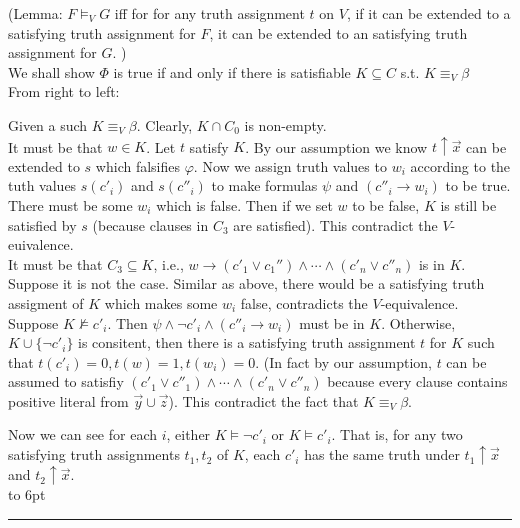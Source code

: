 \documentclass[12pt]{article}
\newenvironment{proof}{\parindent=0pt{\bf Proof: }}{
   \hspace*{\fill}\hbox to 6pt{\leaders\hrule width 6pt height 6pt\hfill}\par}
\begin{document}
\begin{proof}
(Lemma: $F\models_V G$ iff for for any truth assignment $t$ on $V$, if it can be extended to a satisfying truth assignment for $F$, it can be extended to an satisfying truth assignment for $G$.
) \\

We shall show $\Phi$ is true if and only if there is satisfiable $K\subseteq C$ s.t. $K\equiv_V \beta$\\



\color{red} From right to left:\color{black}

Given a such $K\equiv_V \beta$.
Clearly, $K\cap C_0$ is non-empty.\\



It must be that $w\in K$.
Let $t$ satisfy $K$.
By our assumption we know $t\uparrow\vec{x}$ can be extended to $s$ which falsifies $\varphi$. Now we assign truth values to $w_i$ according to the tuth values $s(c'_i)$ and $s(c''_i)$ to make formulas $\psi$ and  $(c''_i\rightarrow w_i)$ to be true. There  must be some $w_i$ which is false. Then if we set $w$ to be false, $K$ is still be satisfied by $s$ (because clauses in $C_3$ are satisfied). This contradict the $V$-euivalence.\\

It must be that $C_3\subseteq K$, i.e., $w\rightarrow (c'_1\vee c_1'')\wedge\cdots\wedge (c'_n\vee c''_n)$ is in $K$. Suppose it is not the case. Similar as above, there would be a satisfying truth assigment of $K$ which makes some $w_i$ false, contradicts the $V$-equivalence. \\


Suppose $K\not\models c'_i$. Then $\psi\wedge\neg c'_i \wedge (c''_i\rightarrow w_i)$ must be in $K$.
Otherwise, $K\cup\{\neg c'_i\}$ is consitent,  then there is a satisfying truth assignment $t$ for $K$ such that $t(c'_i)=0, t(w)=1, t(w_i)=0$. (In fact by our assumption, $t$ can be assumed to satisfiy $(c'_1\vee c''_1)\wedge\cdots\wedge (c'_n\vee c''_n)$ because every clause contains positive literal from $\vec{y}\cup\vec{z}$). This contradict the fact that $K\equiv_V\beta$.


Now we can see for each $i$, either $K\models \neg c'_i$ or $K\models c'_i$.
That is, for any two satisfying truth assignments $t_1, t_2$ of $K$, each $c'_i$ has the same truth under $t_1\uparrow \vec{x}$ and $t_2\uparrow\vec{x}$.  \\






\end{proof}
\end{document}
